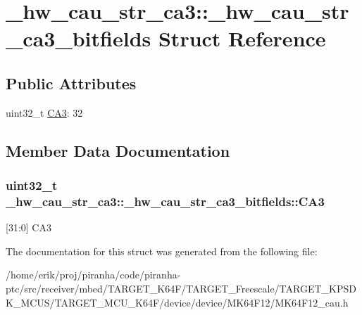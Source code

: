 \hypertarget{struct__hw__cau__str__ca3_1_1__hw__cau__str__ca3__bitfields}{}\section{\+\_\+hw\+\_\+cau\+\_\+str\+\_\+ca3\+:\+:\+\_\+hw\+\_\+cau\+\_\+str\+\_\+ca3\+\_\+bitfields Struct Reference}
\label{struct__hw__cau__str__ca3_1_1__hw__cau__str__ca3__bitfields}
\subsection*{Public Attributes}
\begin{DoxyCompactItemize}
\item 
uint32\+\_\+t \hyperlink{struct__hw__cau__str__ca3_1_1__hw__cau__str__ca3__bitfields_a06a8b02b1cef981448261b29ff3bbba2}{C\+A3}\+: 32
\end{DoxyCompactItemize}


\subsection{Member Data Documentation}
\subsubsection[{\texorpdfstring{C\+A3}{CA3}}]{\setlength{\rightskip}{0pt plus 5cm}uint32\+\_\+t \+\_\+hw\+\_\+cau\+\_\+str\+\_\+ca3\+::\+\_\+hw\+\_\+cau\+\_\+str\+\_\+ca3\+\_\+bitfields\+::\+C\+A3}\hypertarget{struct__hw__cau__str__ca3_1_1__hw__cau__str__ca3__bitfields_a06a8b02b1cef981448261b29ff3bbba2}{}\label{struct__hw__cau__str__ca3_1_1__hw__cau__str__ca3__bitfields_a06a8b02b1cef981448261b29ff3bbba2}
\mbox{[}31\+:0\mbox{]} C\+A3 

The documentation for this struct was generated from the following file\+:\begin{DoxyCompactItemize}
\item 
/home/erik/proj/piranha/code/piranha-\/ptc/src/receiver/mbed/\+T\+A\+R\+G\+E\+T\+\_\+\+K64\+F/\+T\+A\+R\+G\+E\+T\+\_\+\+Freescale/\+T\+A\+R\+G\+E\+T\+\_\+\+K\+P\+S\+D\+K\+\_\+\+M\+C\+U\+S/\+T\+A\+R\+G\+E\+T\+\_\+\+M\+C\+U\+\_\+\+K64\+F/device/device/\+M\+K64\+F12/M\+K64\+F12\+\_\+cau.\+h\end{DoxyCompactItemize}
